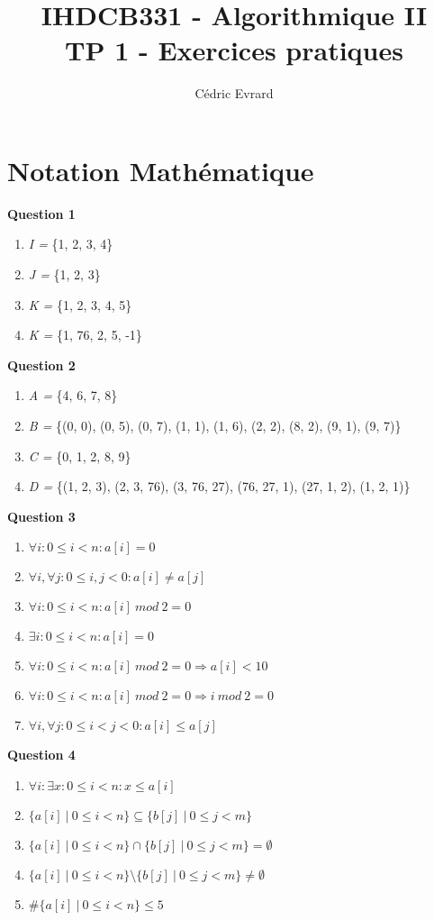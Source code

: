 \documentclass[11pt]{article}
\title{IHDCB331 - Algorithmique II\\
	\large{TP 1 - Exercices pratiques}
}
\author{Cédric Evrard}
\begin{document}
\maketitle

\section{Notation Mathématique}

\textbf{Question 1}
\begin{enumerate}
	\item \textit{I =} \{1, 2, 3, 4\}
	\item \textit{J =} \{1, 2, 3\} 
	\item \textit{K =} \{1, 2, 3, 4, 5\}
	\item \textit{K =} \{1, 76, 2, 5, -1\} 
\end{enumerate}

\textbf{Question 2}
\begin{enumerate}
	\item \textit{A =} \{4, 6, 7, 8\}
	\item \textit{B =} \{(0, 0), (0, 5), (0, 7), (1, 1), (1, 6), (2, 2), (8, 2), (9, 1), (9, 7)\}
	\item \textit{C =} \{0, 1, 2, 8, 9\}
	\item \textit{D =} \{(1, 2, 3), (2, 3, 76), (3, 76, 27), (76, 27, 1), (27, 1, 2), (1, 2, 1)\}
\end{enumerate}

\textbf{Question 3}
\begin{enumerate}
	\item $\forall i : 0 \leq i < n : a[i] = 0$
	\item $\forall i, \forall j : 0 \leq i, j < 0 : a[i] \neq a[j]$
	\item $\forall i : 0 \leq i < n : a[i]\ mod\ 2 = 0$
	\item $\exists i : 0 \leq i < n : a[i] = 0$
	\item $\forall i : 0 \leq i < n : a[i]\ mod\ 2 = 0 \Rightarrow a[i] < 10  $
	\item $\forall i : 0 \leq i < n : a[i]\ mod\ 2 = 0 \Rightarrow i\ mod\ 2 = 0$
	\item $\forall i, \forall j : 0 \leq i < j < 0 : a[i] \leq a[j]$
\end{enumerate}

\textbf{Question 4}
\begin{enumerate}
	\item $\forall i : \exists x : 0 \leq i < n : x \leq a[i] $ 
	\item $\{a[i]\ |\ 0 \leq i < n \} \subseteq \{b[j]\ |\ 0 \leq j < m \}$
	\item $\{a[i]\ |\ 0 \leq i < n \} \cap \{b[j]\ |\ 0 \leq j < m \} = \emptyset$  
	\item $\{a[i]\ |\ 0 \leq i < n \} \setminus \{b[j]\ |\ 0 \leq j < m \} \neq \emptyset$ 
	\item $\#\{a[i]\ |\ 0 \leq i < n \} \leq 5$
\end{enumerate}
\end{document}
